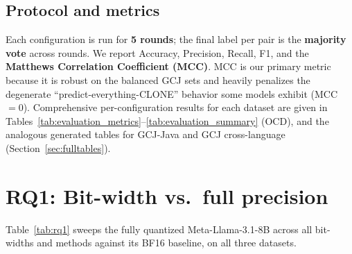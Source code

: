 \documentclass[11pt]{article}
\begin{document}
\subsection{Protocol and metrics}
Each configuration is run for \textbf{5 rounds}; the final label per pair is the
\textbf{majority vote} across rounds. We report Accuracy, Precision, Recall, F1,
and the \textbf{Matthews Correlation Coefficient (MCC)}. MCC is our primary
metric because it is robust on the balanced GCJ sets and heavily penalizes the
degenerate ``predict-everything-CLONE'' behavior some models exhibit
(MCC~$=0$). Comprehensive per-configuration results for each dataset are given
in Tables~\ref{tab:evaluation_metrics}--\ref{tab:evaluation_summary} (OCD),
and the analogous generated tables for GCJ-Java and GCJ cross-language
(Section~\ref{sec:fulltables}).

\section{RQ1: Bit-width vs.\ full precision}
Table~\ref{tab:rq1} sweeps the fully quantized Meta-Llama-3.1-8B across all
bit-widths and methods against its BF16 baseline, on all three datasets.
\end{document}

